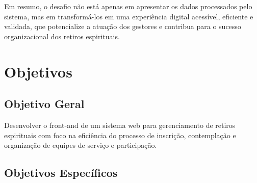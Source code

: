 Em resumo, o desafio não está apenas em apresentar os dados processados pelo sistema, mas em transformá-los em uma experiência digital acessível, eficiente e validada, que potencialize a atuação dos gestores e contribua para o sucesso organizacional dos retiros espirituais.

\section{Objetivos}

\subsection{Objetivo Geral}

Desenvolver o front-and de um sistema web para gerenciamento de retiros espirituais com foco na eficiência do processo de inscrição, contemplação e organização de equipes de serviço e participação.
	
\subsection{Objetivos Específicos}

